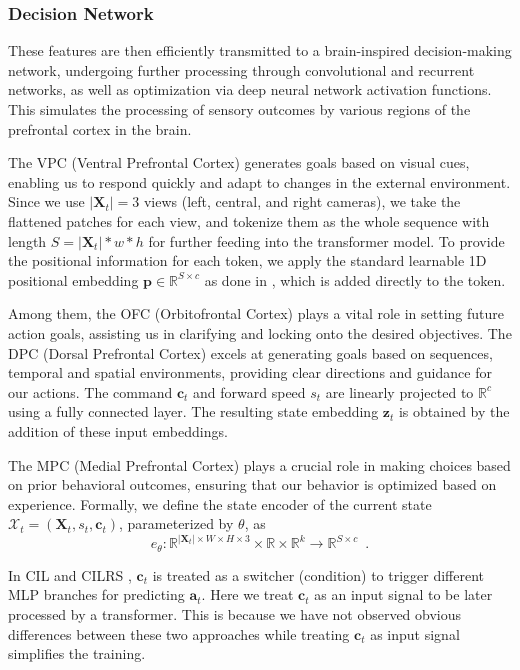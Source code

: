 \subsubsection{Decision Network}
These features are then efficiently transmitted to a brain-inspired decision-making network, undergoing further processing through convolutional and recurrent networks, as well as optimization via deep neural network activation functions. 
This simulates the processing of sensory outcomes by various regions of the prefrontal cortex in the brain. 
%


The VPC (Ventral Prefrontal Cortex) generates goals based on visual cues, enabling us to respond quickly and adapt to changes in the external environment.  
%
Since we use $|\mathbf{X}_{t}|=3$ views (left, central, and right cameras), we take the flattened patches for each view, and tokenize them as the whole sequence with length $S=|\mathbf{X}_t|*w*h$ for further feeding into the transformer model. 
To provide the positional information for each token, we apply the standard learnable 1D positional embedding $\mathbf{p}\in \mathbb{R}^{S\times c}$ as done in \cite{Alexey:2021}, which is added directly to the token. 


Among them, the OFC (Orbitofrontal Cortex) plays a vital role in setting future action goals, assisting us in clarifying and locking onto the desired objectives. 
The DPC (Dorsal Prefrontal Cortex) excels at generating goals based on sequences, temporal and spatial environments, providing clear directions and guidance for our actions.
The command $\mathbf{c}_t$ and forward speed $s_t$ are linearly projected to $\mathbb{R}^{c}$ using a fully connected layer.
The resulting state embedding $\mathbf{z}_t$ is obtained by the addition of these input embeddings. 


The MPC (Medial Prefrontal Cortex) plays a crucial role in making choices based on prior behavioral outcomes, ensuring that our behavior is optimized based on experience.
Formally, we define the state encoder of the current state $\mathcal{X}_t=(\mathbf{X}_t, s_t, \mathbf{c}_t)$, parameterized by $\theta$, as
\begin{equation}\label{eq:encoder}
	e_{\theta}: \mathbb{R}^{|\mathbf{X}_{t}|\times W\times H\times3}\times\mathbb{R}\times \mathbb{R}^k \rightarrow \mathbb{R}^{S \times c} \enspace .
\end{equation}


In CIL \cite{Codevilla:2018} and CILRS \cite{Codevilla:2019}, $\mathbf{c}_{t}$ is treated as a switcher (condition) to trigger different MLP branches for predicting $\mathbf{a}_{t}$. 
Here we treat $\mathbf{c}_{t}$ as an input signal to be later processed by a transformer. 
This is because we have not observed obvious differences between these two approaches while treating $\mathbf{c}_{t}$ as input signal simplifies the training. 


